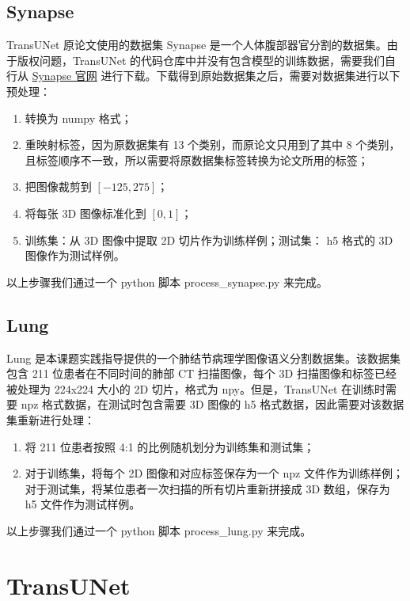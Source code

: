 \documentclass[hyperref,a4paper,UTF8]{ctexart}
\begin{document}
\subsection{Synapse}

TransUNet 原论文使用的数据集 Synapse 是一个人体腹部器官分割的数据集。由于版权问题，TransUNet 的代码仓库中并没有包含模型的训练数据，需要我们自行从 \href{https://www.synapse.org/#!Synapse:syn3193805/wiki/}{Synapse 官网} 进行下载。下载得到原始数据集之后，需要对数据集进行以下预处理：

\begin{enumerate}[itemsep=2pt,topsep=0pt,parsep=0pt]
    \item 转换为 numpy 格式；
    \item 重映射标签，因为原数据集有 13 个类别，而原论文只用到了其中 8 个类别，且标签顺序不一致，所以需要将原数据集标签转换为论文所用的标签；
    \item 把图像裁剪到 $[-125, 275]$；
    \item 将每张 3D 图像标准化到 $[0, 1]$；
    \item 训练集：从 3D 图像中提取 2D 切片作为训练样例；测试集： h5 格式的 3D 图像作为测试样例。
\end{enumerate}

以上步骤我们通过一个 python 脚本 process\_synapse.py 来完成。

\subsection{Lung}

Lung 是本课题实践指导提供的一个肺结节病理学图像语义分割数据集。该数据集包含 211 位患者在不同时间的肺部 CT 扫描图像，每个 3D 扫描图像和标签已经被处理为 224x224 大小的 2D 切片，格式为 npy。但是，TransUNet 在训练时需要 npz 格式数据，在测试时包含需要 3D 图像的 h5 格式数据，因此需要对该数据集重新进行处理：

\begin{enumerate}[itemsep=2pt,topsep=0pt,parsep=0pt]
    \item 将 211 位患者按照 4:1 的比例随机划分为训练集和测试集；
    \item 对于训练集，将每个 2D 图像和对应标签保存为一个 npz 文件作为训练样例；对于测试集，将某位患者一次扫描的所有切片重新拼接成 3D 数组，保存为 h5 文件作为测试样例。
\end{enumerate}

以上步骤我们通过一个 python 脚本 process\_lung.py 来完成。

\section{TransUNet}
\end{document}
